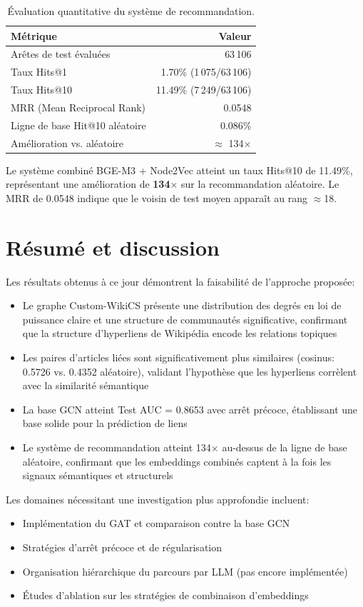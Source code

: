 \begin{table}[htbp]
\centering
\caption{Évaluation quantitative du système de recommandation.}
\label{tab:quantitative-eval}
\begin{tabular}{lr}
\toprule
\textbf{Métrique} & \textbf{Valeur} \\
\midrule
Arêtes de test évaluées & 63\,106 \\
Taux Hits@1 & 1.70\% (1\,075/63\,106) \\
Taux Hits@10 & 11.49\% (7\,249/63\,106) \\
MRR (Mean Reciprocal Rank) & 0.0548 \\
Ligne de base Hit@10 aléatoire & 0.086\% \\
Amélioration vs. aléatoire & $\approx$ 134$\times$ \\
\bottomrule
\end{tabular}
\end{table}

Le système combiné BGE-M3 + Node2Vec atteint un taux Hits@10 de 11.49\%, représentant une amélioration de \textbf{134$\times$} sur la recommandation aléatoire. Le MRR de 0.0548 indique que le voisin de test moyen apparaît au rang $\approx$18.

\section{Résumé et discussion}

Les résultats obtenus à ce jour démontrent la faisabilité de l'approche proposée:

\begin{itemize}
    \item Le graphe Custom-WikiCS présente une distribution des degrés en loi de puissance claire et une structure de communautés significative, confirmant que la structure d'hyperliens de Wikipédia encode les relations topiques
    \item Les paires d'articles liées sont significativement plus similaires (cosinus: 0.5726 vs. 0.4352 aléatoire), validant l'hypothèse que les hyperliens corrèlent avec la similarité sémantique
    \item La base GCN atteint Test AUC = 0.8653 avec arrêt précoce, établissant une base solide pour la prédiction de liens
    \item Le système de recommandation atteint 134$\times$ au-dessus de la ligne de base aléatoire, confirmant que les embeddings combinés captent à la fois les signaux sémantiques et structurels
\end{itemize}

Les domaines nécessitant une investigation plus approfondie incluent:
\begin{itemize}
    \item Implémentation du GAT et comparaison contre la base GCN
    \item Stratégies d'arrêt précoce et de régularisation
    \item Organisation hiérarchique du parcours par LLM (pas encore implémentée)
    \item Études d'ablation sur les stratégies de combinaison d'embeddings
\end{itemize}
